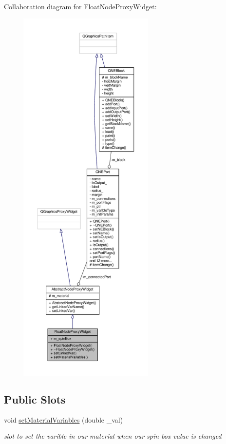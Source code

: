 Collaboration diagram for Float\-Node\-Proxy\-Widget\-:
\nopagebreak
\begin{figure}[H]
\begin{center}
\leavevmode
\includegraphics[height=550pt]{class_float_node_proxy_widget__coll__graph}
\end{center}
\end{figure}
\subsection*{Public Slots}
\begin{DoxyCompactItemize}
\item 
void \hyperlink{class_float_node_proxy_widget_af2534a2cae437c7b5c123d52315d0fbf}{set\-Material\-Variables} (double \-\_\-val)
\begin{DoxyCompactList}\small\item\em slot to set the varible in our material when our spin box value is changed \end{DoxyCompactList}\end{DoxyCompactItemize}
